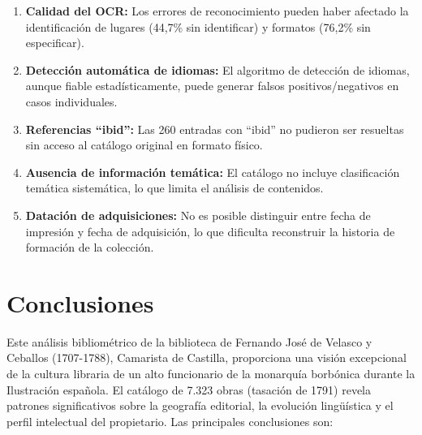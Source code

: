\documentclass[12pt,a4paper]{article}
\begin{document}
\begin{enumerate}
    \item \textbf{Calidad del OCR:} Los errores de reconocimiento pueden haber afectado la identificación de lugares (44,7\% sin identificar) y formatos (76,2\% sin especificar).

    \item \textbf{Detección automática de idiomas:} El algoritmo de detección de idiomas, aunque fiable estadísticamente, puede generar falsos positivos/negativos en casos individuales.

    \item \textbf{Referencias ``ibid'':} Las 260 entradas con ``ibid'' no pudieron ser resueltas sin acceso al catálogo original en formato físico.

    \item \textbf{Ausencia de información temática:} El catálogo no incluye clasificación temática sistemática, lo que limita el análisis de contenidos.

    \item \textbf{Datación de adquisiciones:} No es posible distinguir entre fecha de impresión y fecha de adquisición, lo que dificulta reconstruir la historia de formación de la colección.
\end{enumerate}

\section{Conclusiones}

Este análisis bibliométrico de la biblioteca de Fernando José de Velasco y Ceballos (1707-1788), Camarista de Castilla, proporciona una visión excepcional de la cultura libraria de un alto funcionario de la monarquía borbónica durante la Ilustración española. El catálogo de 7.323 obras (tasación de 1791) revela patrones significativos sobre la geografía editorial, la evolución lingüística y el perfil intelectual del propietario. Las principales conclusiones son:
\end{document}
